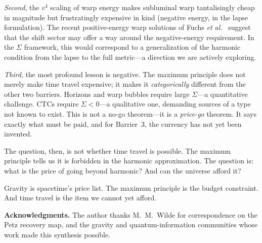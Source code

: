 \documentclass[12pt]{article}
\begin{document}
\emph{Second}, the $v^4$ scaling of warp energy makes subluminal warp
tantalisingly cheap in magnitude but frustratingly expensive in kind
(negative energy, in the lapse formulation). The recent positive-energy
warp solutions of Fuchs \emph{et al.}~\cite{Fuchs2024} suggest that
the shift sector may offer a way around the negative-energy
requirement. In the $\Sigma$ framework, this would correspond to a
generalization of the harmonic condition from the lapse to the full
metric---a direction we are actively exploring.

\emph{Third}, the most profound lesson is negative. The maximum
principle does not merely make time travel expensive; it makes it
\emph{categorically} different from the other two barriers. Horizons
and warp bubbles require large $\Sigma$---a quantitative challenge. CTCs
require $\Sigma < 0$---a qualitative one, demanding sources of a
type not known to exist. This is not a no-go theorem---it is a
\emph{price-go} theorem. It says exactly what must be paid, and for
Barrier~3, the currency has not yet been invented.



The question, then, is not whether time travel is possible. The
maximum principle tells us it is forbidden in the harmonic
approximation. The question is: what is the price of going beyond
harmonic? And can the universe afford it?

\bigskip

Gravity is spacetime's price list. The maximum principle is the budget
constraint. And time travel is the item we cannot yet afford.

\bigskip

\noindent\textbf{Acknowledgments.}
The author thanks M.~M.~Wilde for correspondence on the Petz recovery
map, and the gravity and quantum-information communities whose work made
this synthesis possible.
\end{document}
